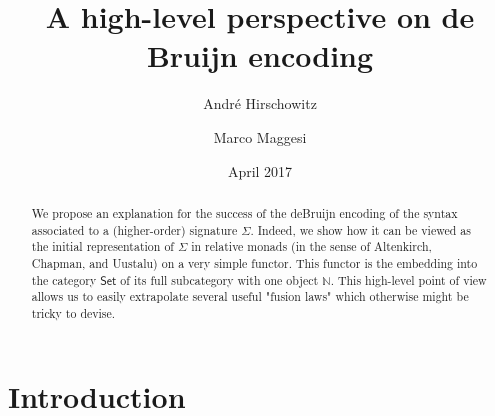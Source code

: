 \documentclass[a4paper,twoside,12pt]{article}
\title{A high-level perspective on de Bruijn encoding}
\author{Andr\'e Hirschowitz \and Marco Maggesi}
\date{April 2017}
\theoremstyle{definition}
\theoremstyle{remark}
\theoremstyle{example}
\newcommand{\NN}{\mathbb{N}}
\begin{document}
\maketitle

\begin{abstract}

  We propose an explanation for the success of the deBruijn encoding
  of the syntax associated to a (higher-order) signature $\Sigma$.
  Indeed, we show how it can be viewed as the initial representation
  of $\Sigma$ in relative monads (in the sense of Altenkirch, Chapman,
  and Uustalu) on a very simple functor.  This functor is the
  embedding into the category $\mathsf{Set}$ of its full subcategory
  with one object $\NN$.  This high-level point of view allows us to
  easily extrapolate several useful "fusion laws" which otherwise
  might be tricky to devise.
\end{abstract}

\tableofcontents{}

\section{Introduction}
\label{sec:intro}


\end{document}
